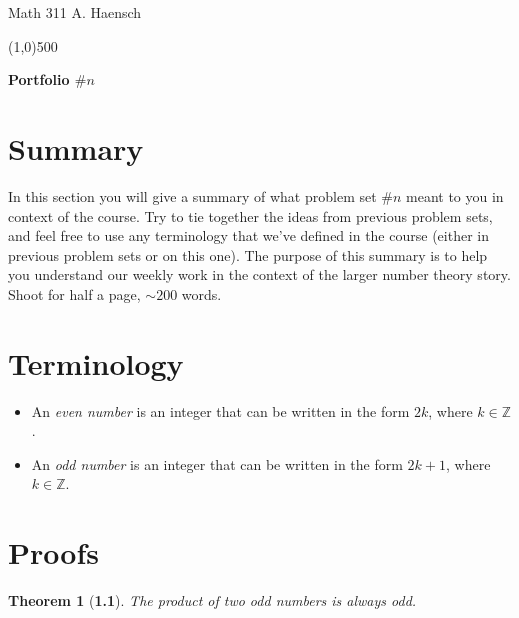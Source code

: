 \documentclass[11pt]{article}
\newtheorem*{theorem}{Theorem}
\begin{document}
{ \noindent Math 311 
} \hfill A. Haensch %

\vskip 2mm

\begin{center}
\line(1,0){500}
\end{center}

\begin{center}
{\bf \Large \sc Portfolio $\# n$ %
}
\end{center}


\section*{Summary}  

In this section you will give a summary of what problem set $\#n$ meant to you in context of the course.  Try to tie together the ideas from previous problem sets, and feel free to use any terminology that we've defined in the course (either in previous problem sets or on this one).  The purpose of this summary is to help you understand our weekly work in the context of the larger number theory story. Shoot for half a page, $\sim 200$ words. 

\section*{Terminology} %
\begin{itemize}
\item An {\em even number} is an integer that can be written in the form $2k$, where $k\in \mathbb Z$.
\item An {\em odd number} is an integer that can be written in the form $2k+1$, where $k\in \mathbb Z$.
\end{itemize}

\section*{Proofs}

\begin{theorem}[\textbf{1.1}]  %
The product of two odd numbers is always odd.  
\end{theorem}
\end{document}
